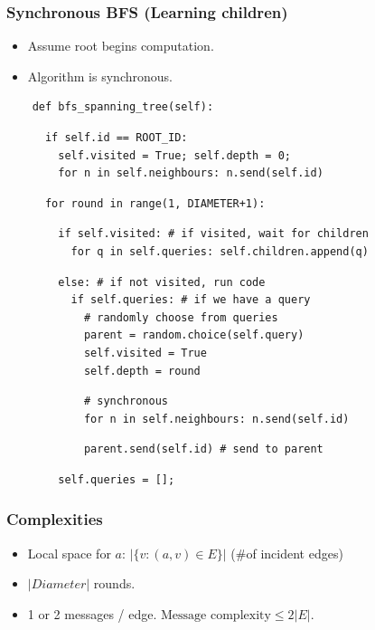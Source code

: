\documentclass{beamer}
\begin{document}
\begin{frame}[fragile]
    \frametitle{Synchronous BFS (Learning children)}
    \begin{itemize}
        \item Assume root begins computation.
        \item Algorithm is synchronous.
    \end{itemize}

    \begin{verbatim}
    def bfs_spanning_tree(self):
    \end{verbatim}
    \begin{verbatim}
      if self.id == ROOT_ID:
        self.visited = True; self.depth = 0;
        for n in self.neighbours: n.send(self.id)
    \end{verbatim}
    \begin{verbatim}
      for round in range(1, DIAMETER+1):
    \end{verbatim}
    \begin{verbatim}
        if self.visited: # if visited, wait for children
          for q in self.queries: self.children.append(q)
    \end{verbatim}
    \begin{verbatim}
        else: # if not visited, run code
          if self.queries: # if we have a query
            # randomly choose from queries
            parent = random.choice(self.query)
            self.visited = True
            self.depth = round
    \end{verbatim}
    \begin{verbatim}
            # synchronous
            for n in self.neighbours: n.send(self.id)
    \end{verbatim}
    \begin{verbatim}
            parent.send(self.id) # send to parent
    \end{verbatim}
    \begin{verbatim}
        self.queries = [];
    \end{verbatim}
\end{frame}

\begin{frame}
    \frametitle{Complexities}
    \pause
    \begin{itemize}
        \item Local space for $a$: $|\{ v : (a, v) \in E \}|$ (\#of incident edges) \pause
        \item $|Diameter|$ rounds. \pause
        \item 1 or 2 messages / edge. $\text{Message complexity} \leq 2|E|$.
    \end{itemize}
\end{frame}
\end{document}

